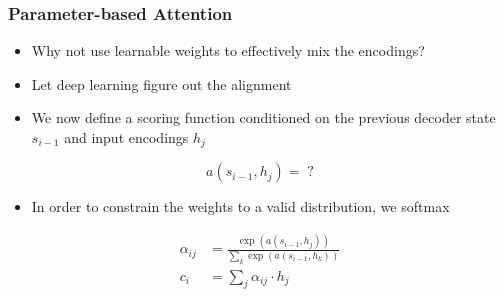 \documentclass[usenames,dvipsnames]{beamer}
\begin{document}
\begin{frame}
\frametitle{Parameter-based Attention}
\begin{itemize}
  \item Why not use learnable weights to effectively mix the encodings?
  \item Let deep learning figure out the alignment
  \item We now define a scoring function conditioned on the previous decoder state $s_{i-1}$ and input encodings $h_j$
\end{itemize}
\begin{equation*}
  a\left( s_{i-1}, h_j \right) = \;?
\end{equation*}
\begin{itemize}
  \item In order to constrain the weights to a valid distribution, we softmax
\end{itemize}
\begin{equation*}
  \begin{split}
    \alpha_{ij} &= \frac{\exp\left( a\left( s_{i-1}, h_j \right) \right)}{\sum_k \exp\left( a\left( s_{i-1}, h_k \right) \right)}\\
    c_i &= \sum_{j} \alpha_{ij} \cdot h_j
  \end{split}
\end{equation*}
\end{frame}
\end{document}
